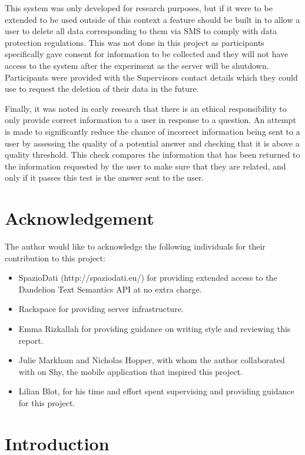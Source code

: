 \documentclass[authoryearcitations]{UoYCSproject}
\begin{document}
This system was only developed for research purposes, but if it were to be extended to be used outside of this context a feature should be built in to allow a user to delete all data corresponding to them via SMS to comply with data protection regulations. This was not done in this project as participants specifically gave consent for information to be collected and they will not have access to the system after the experiment as the server will be shutdown. Participants were provided with the Supervisors contact details which they could use to request the deletion of their data in the future.

Finally, it was noted in early research that there is an ethical responsibility to only provide correct information to a user in response to a question. An attempt is made to significantly reduce the chance of incorrect information being sent to a user by assessing the quality of a potential answer and checking that it is above a quality threshold. This check compares the information that has been returned to the information requested by the user to make sure that they are related, and only if it passes this test is the answer sent to the user.

\newpage
\chapter*{Acknowledgement}
The author would like to acknowledge the following individuals for their contribution to this project:

\begin{itemize}
  \item SpazioDati (http://spaziodati.eu/) for providing extended access to the Dandelion Text Semantics API at no extra charge.
  \item Rackspace for providing server infrastructure.
  \item Emma Rizkallah for providing guidance on writing style and reviewing this report.
  \item Julie Markham and Nicholas Hopper, with whom the author collaborated with on Shy, the mobile application that inspired this project.
  \item Lilian Blot, for his time and effort spent supervising and providing guidance for this project.
\end{itemize}

\newpage
\chapter{Introduction}
\end{document}
